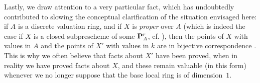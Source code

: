 \begin{env}[3.7.3]
\label{1.3.7.3}
Lastly, we draw attention to a very particular fact, which has undoubtedly contributed to slowing the conceptual clarification of the situation envisaged here: if $A$ is a discrete valuation ring, and if $X$ is \emph{proper} over $A$ (which is indeed the case if $X$ is a closed subprescheme of some $\mathbf{P}_A^r$, cf. ), then the points of $X$ with values in $A$ and the points of $X'$ with values in $k$ are in bijective correspondence .
This is why we often believe that facts about $X'$ have been proved, when in reality we have proved facts about $X$, and these remain valuable (in this form) whenever we no longer suppose that the base local ring is of dimension~$1$.
\end{env}

